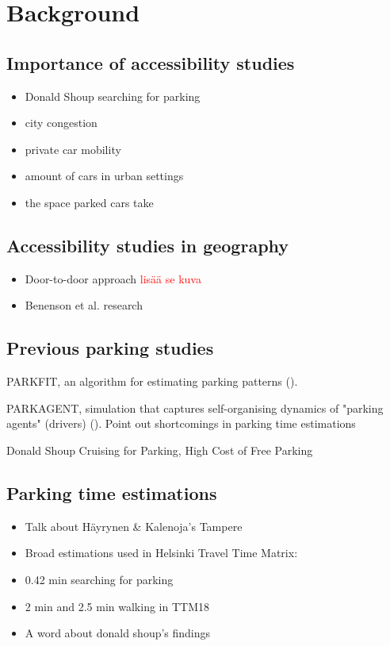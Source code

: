 \section{Background}
\subsection{Importance of accessibility studies}
\justify

\begin{itemize}
    \item Donald Shoup searching for parking
    \item city congestion
    \item private car mobility
    \item amount of cars in urban settings
    \item the space parked cars take
\end{itemize}

\newpage
\subsection{Accessibility studies in geography}
\justify

\begin{itemize}
  \item Door-to-door approach \textcolor{red}{lisää se kuva}
  \item Benenson et al. research
\end{itemize}

\newpage
\subsection{Previous parking studies}
\justify

PARKFIT, an algorithm for estimating parking patterns (\cite{Levy2015}).

PARKAGENT, simulation that captures self-organising dynamics of "parking agents" (drivers) (\cite{Benenson2008}). Point out shortcomings in parking time estimations

Donald Shoup Cruising for Parking, High Cost of Free Parking

\newpage
\subsection{Parking time estimations}
\justify

\begin{itemize}
  \item Talk about Häyrynen \& Kalenoja's Tampere
  \item Broad estimations used in Helsinki Travel Time Matrix:
  \item 0.42 min searching for parking
  \item 2 min and 2.5 min walking in TTM18
  \item A word about donald shoup's findings
\end{itemize}

